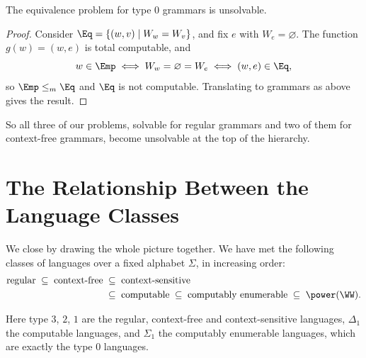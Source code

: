 \begin{corollary}
	The equivalence problem for type $0$ grammars is unsolvable.
\end{corollary}

\begin{proof}
	Consider $\Eq = \{(w,v) \mid W_w = W_v\}$, and fix $e$ with $W_e = \varnothing$. The function $g(w) = (w,e)$ is total computable, and
	$$w \in \Emp \iff W_w = \varnothing = W_e \iff (w,e) \in \Eq,$$
	so $\Emp \leq_m \Eq$ and $\Eq$ is not computable. Translating to grammars as above gives the result.
\end{proof}

So all three of our problems, solvable for regular grammars and two of them for context-free grammars, become unsolvable at the top of the hierarchy.

\section{The Relationship Between the Language Classes}

We close by drawing the whole picture together. We have met the following classes of languages over a fixed alphabet $\Sigma$, in increasing order:
\begin{align*}
	\text{regular} \;\subseteq\; \text{context-free} &\;\subseteq\; \text{context-sensitive} \\
	&\;\subseteq\; \text{computable} \;\subseteq\; \text{computably enumerable} \;\subseteq\; \power(\WW).
\end{align*}

\begin{center}
\end{center}
Here type $3$, $2$, $1$ are the regular, context-free and context-sensitive languages, $\Delta_1$ the computable languages, and $\Sigma_1$ the computably enumerable languages, which are exactly the type $0$ languages.

